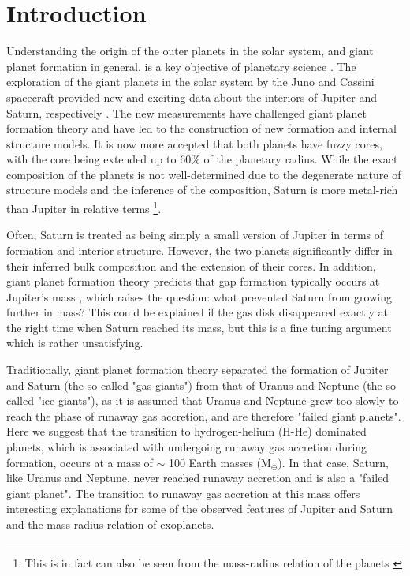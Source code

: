 \documentclass{aa}
\begin{document}
\section{Introduction}
Understanding the origin of the outer planets in the solar system, and giant planet formation in general, is a key objective of planetary science \citep[e.g.,][and references therein]{HelledMorby, Helled2014}. 
The exploration of the giant planets in the solar system by the Juno and Cassini spacecraft provided new and exciting data about the interiors of Jupiter and Saturn, respectively \citep[e.g.,][]{Wahl2017a,2021NatAs...5.1103M,Helled2022,2022A&A...662A..18M}.  The new measurements have challenged giant planet formation theory and have led to the construction of new formation and internal structure models. It is now more accepted that both planets have fuzzy cores, with the core being extended up to 60\% of the planetary radius.
While the exact composition of the planets is not well-determined due to the degenerate nature of structure models and the inference of the composition, Saturn is more metal-rich than Jupiter in relative terms \citep[e.g.,][]{2021PSJ.....2..241N}\footnote{This is in fact can also be seen from the mass-radius relation of the planets \citep[e.g.,][]{2020NatRP...2..562H}}. 
\par

Often, Saturn is treated as being simply a small version of Jupiter in terms of formation and interior structure. However, the two planets significantly differ in their inferred bulk composition and the extension of their cores. In addition, giant planet formation theory predicts that gap formation typically occurs at Jupiter's mass \citep{2017ApJ...835..146D}, which raises the question: what prevented Saturn from growing further in mass? This could be explained if the gas disk disappeared exactly at the right time when Saturn reached its mass, but this is a fine tuning argument which is rather unsatisfying.   
\par 

Traditionally, giant planet formation theory separated the formation of Jupiter and Saturn (the so called "gas giants") from that of Uranus and Neptune (the so called "ice giants"), as it is assumed that Uranus and Neptune grew too slowly to reach the phase of runaway gas accretion, and are therefore "failed giant planets". 
Here we suggest that the transition to hydrogen-helium (H-He) dominated planets, which is associated with undergoing runaway gas accretion during formation, occurs at a mass of $\sim$ 100 Earth masses (M$_{\oplus}$). In that case, Saturn, like Uranus and Neptune, never reached runaway accretion and is also a "failed giant planet". 
The transition to runaway gas accretion at this mass offers interesting explanations for some of the observed features of Jupiter and Saturn and the mass-radius relation of exoplanets.  
\end{document}
